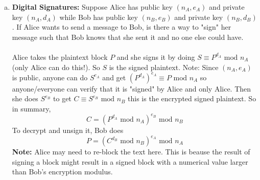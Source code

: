 \documentclass[class=article, crop=false]{standalone}
\begin{document}
\begin{enumerate}[1.]
\begin{enumerate}[(a)]
		\item \textbf{Digital Signatures:} Suppose Alice has public key $(n_A, e_A)$ and
		private key $(n_A, d_A)$ while Bob has public key $(n_B, e_B)$ and private key $(n_B, d_B)$.
		If Alice wants to send a message to Bob, is there a way to "sign" her message such that
		Bob knows that she sent it and no one else could have. \\\\
		Alice takes the plaintext block $P$ and she signs it by doing $S\equiv P^{d_A}\mbox{ mod }n_A$
		(only Alice can do this!). So $S$ is the signed plaintext. Note: Since $(n_A, e_A)$ is public,
		anyone can do $S^{e_A}$ and get $(P^{d_A})^{e_A}\equiv P\mbox{ mod }n_A$ so anyone/everyone
		can verify that it is "signed" by Alice and only Alice. Then she does
		$S^{e_B}$ to get $C\equiv S^{e_B}\mbox{ mod }n_{B}$ this is the encrypted signed plaintext.
		So in summary, $$C= \left(P^{d_A} \mbox{ mod }n_A\right)^{e_B} \mbox{ mod }n_B$$
		To decrypt and unsign it, Bob does
		$$P = \left(C^{d_B}\mbox{ mod }n_B\right)^{e_A} \mbox{ mod }n_A$$
		\textbf{Note:} Alice may need to re-block the text here. This is beause the result of
		signing a block might result in a signed block with a numerical value larger than Bob's
		encryption modulus.
	\end{enumerate}
\end{enumerate}

\end{document}
